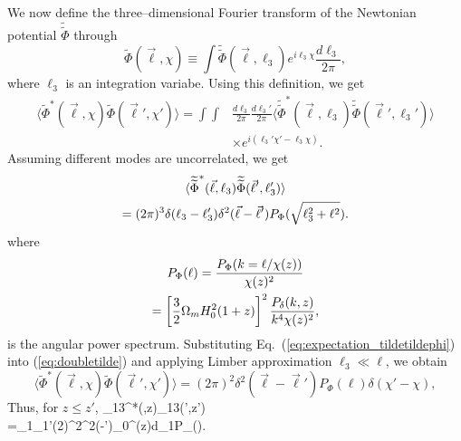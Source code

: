 We now define the three--dimensional Fourier transform of the Newtonian potential $\widetilde{\widetilde\Phi}$ through
\begin{equation}
\widetilde{\Phi}(\vec{\ell},\chi)\equiv\int\widetilde{\widetilde{\Phi}}(\vec{\ell},\ell_3)e^{i\ell_3\chi}\frac{d\ell_3}{2\pi},
\end{equation}
where $\ell_3$ is an integration variabe. Using this definition, we get
\begin{align}
\langle\widetilde{\Phi}^*(\vec{\ell},\chi)\widetilde{\Phi}(\vec{\ell}',\chi')\rangle=\int\int&\frac{d\ell_3}{2\pi}\frac{d\ell_3'}{2\pi}\langle\widetilde{\widetilde{\Phi}}^*(\vec{\ell},\ell_3)\widetilde{\widetilde{\Phi}}(\vec{\ell}',\ell_3')\rangle\nonumber\\
&\times e^{i(\ell_3'\chi'-\ell_3\chi)}. \label{eq:doubletilde}
\end{align}
Assuming different modes are uncorrelated, we get
\begin{equation}
\begin{gathered}
\langle\widetilde{\widetilde{\Phi}}^*(\vec{\ell},\ell_3)\widetilde{\widetilde{\Phi}}(\vec{\ell}',\ell_3')\rangle\\
=(2\pi)^3\delta(\ell_3-\ell_3')\delta^2(\vec{\ell}-\vec{\ell}')P_{\Phi}(\sqrt{\ell_3^2+\ell^2}).
\end{gathered}
\label{eq:expectation_tildetildephi}
\end{equation}
where
\begin{equation}
\begin{gathered}
P_{\Phi}(\ell)=\frac{P_{\Phi}(k=\ell/\chi(z))}{\chi(z)^2}\\
=\left[\frac{3}{2}\Omega_mH_0^2(1+z)\right]^2\frac{P_{\delta}(k,z)}{k^4\chi(z)^2},
\end{gathered}
\end{equation}
is the angular power spectrum.
Substituting Eq.~(\ref{eq:expectation_tildetildephi}) into (\ref{eq:doubletilde}) and applying Limber approximation $\ell_3\ll\ell$, we obtain
\begin{equation}
\langle\widetilde{\Phi}^*(\vec{\ell},\chi)\widetilde{\Phi}(\vec{\ell}',\chi')\rangle=(2\pi)^2\delta^2(\vec{\ell}-\vec{\ell}')P_{\Phi}(\ell)\delta(\chi'-\chi),
\end{equation}
Thus, for $z\leq z'$,
\beq
\bga
\langle\widetilde{\gamma}_{13}^*(\vec{\ell},z)\widetilde{\gamma}_{13}(\vec{\ell}',z')\rangle\\
=\ell_1\ell_1'(2\pi)^2\delta^2(\vec{\ell}-\vec{\ell}')\int_0^{\chi(z)}d\chi_1P_{\Phi}(\ell).
\ega
\label{eq:exp_gamma13}
\eeq

